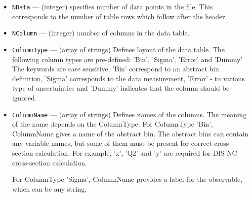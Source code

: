 \begin{itemize}
\begin{itemize}
                      \end{itemize}                       
      \item {\tt NData}       --- (integer) specifies number of data points in the file. 
                     This corresponds to the number of table rows which 
                     follow after the header.
      \item {\tt NColumn}     --- (integer) number of columns in the data table.
      \item {\tt ColumnType}  --- (array of strings)
                      Defines layout of the data table. The following column types
                      are pre-defined: 'Bin', 'Sigma', 'Error' and 'Dummy'
                      The keywords are case sensitive. 'Bin' correspond to an
                      abstract bin definition, 'Sigma' corresponds to the data
                      measurement, 'Error' - to various type of uncertainties and
                      'Dummy' indicates that the column should be ignored.
      \item {\tt ColumnName}  --- (array of strings)
                      Defines names of the columns. The meaning of the name depends
                      on the ColumnType. For ColumnType 'Bin', ColumnName gives a
                      name of the abstract bin. The abstract bins can contain
                      any variable names, but some of them must be present for 
                      correct cross section calculation. For example, 'x', 'Q2' and
                      'y' are required for DIS NC cross-section calculation.
 
                      For ColumnType 'Sigma', ColumnName provides a label for 
                      the observable, which can be any string.
 

\end{itemize}
